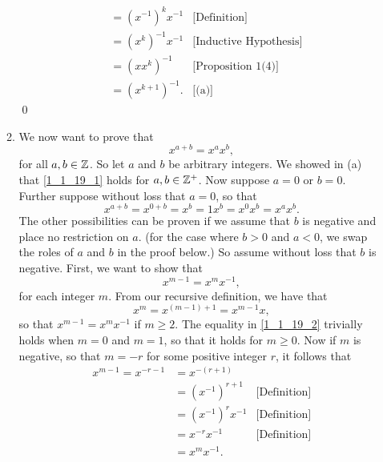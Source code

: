 \begin{enumerate}
\begin{enumerate}
\begin{align*}
                          &= (x^{-1})^kx^{-1} &\text{[Definition]} \\
                          &= (x^k)^{-1}x^{-1} &\text{[Inductive Hypothesis]} \\
                          &= (xx^k)^{-1} &\text{[Proposition 1(4)]}\\
                          &= (x^{k+1})^{-1}. &\text{[(a)]}
               \end{align*} \qed
         \item We now want to prove that
               \begin{equation} \label{1_1_19_1}
                  x^{a+b} = x^ax^b,
               \end{equation}
               for all $a, b \in \mathbb{Z}$. So let $a$ and $b$ be arbitrary integers.
               We showed in (a) that \eqref{1_1_19_1} holds for $a, b \in \mathbb{Z}^+$.
               Now suppose $a = 0$ or $b = 0$. Further suppose without loss that
               $a = 0$, so that
               $$x^{a+b} = x^{0+b} = x^b = 1x^b = x^0x^b = x^ax^b.$$
               The other possibilities can be proven if we assume that $b$ is
               negative and place no restriction on $a$. (for the case where
               $b > 0$ and $a < 0$, we swap the roles of $a$ and $b$ in the
               proof below.) So assume without loss
               that $b$ is negative. First, we want to show that
               \begin{equation} \label{1_1_19_2}
                  x^{m-1} = x^mx^{-1},
               \end{equation}
               for each integer $m$. From our recursive definition, we have that
               $$x^m = x^{(m-1) + 1} = x^{m-1}x,$$
               so that $x^{m-1} = x^mx^{-1}$ if $m \ge 2$. The equality in
               \eqref{1_1_19_2} trivially holds when $m = 0$ and $m = 1$, so
               that it holds for $m \ge 0$. Now if $m$ is negative, so that
               $m = -r$ for some positive integer $r$, it follows that
               \begin{align*}
                  x^{m-1} = x^{-r-1} &= x^{-(r+1)} \\
                          &= (x^{-1})^{r+1} &\text{[Definition]} \\
                          &= (x^{-1})^rx^{-1} &\text{[Definition]} \\
                          &= x^{-r}x^{-1} &\text{[Definition]} \\
                          &= x^mx^{-1}.
               \end{align*}


\end{enumerate}
\end{enumerate}
